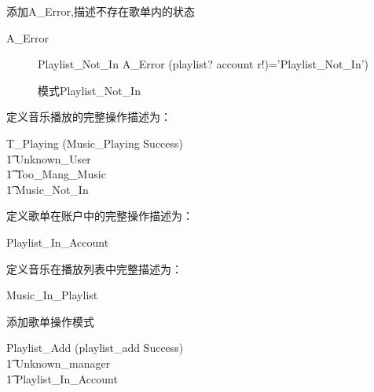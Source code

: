\documentclass[14pt]{article}
\numberwithin{figure}{subsection}
\begin{document}
\begin{minipage}[t]{0.5\linewidth}
    \begin{flushleft}
        添加A\_Error,描述不存在歌单内的状态
        \begin{syntax}
            A\_Error
        \end{syntax}
        \vspace{-1.5cm}
        \begin{figure}[H]
            \setlength{\abovecaptionskip}{0.cm}
            \setlength{\belowcaptionskip}{0.cm}
            \begin{schema}{Playlist\_Not\_In}
                A\_Error
                \where
                (playlist? \not\in account \wedge r!)='Playlist\_Not\_In')
            \end{schema}
            \caption{模式Playlist\_Not\_In}
        \end{figure}

        定义音乐播放的完整操作描述为：
        \begin{syntax}
            \hspace{-0.7cm}
            T\_Playing   (Music\_Playing \wedge Success)\\
            \t1 \vee Unknown\_User\\
            \t1 \vee Too\_Mang\_Music\\
            \t1 \vee Music\_Not\_In\\
        \end{syntax}

        定义歌单在账户中的完整操作描述为：
        \begin{syntax}
            \hspace{-0.7cm}
            Playlist\_In\_Account 
        \end{syntax}

        定义音乐在播放列表中完整描述为：
        \begin{syntax}
            \hspace{-0.7cm}
            Music\_In\_Playlist 
        \end{syntax}

        添加歌单操作模式
        \begin{syntax}
            \hspace{-0.7cm}
            Playlist\_Add   (playlist\_add \wedge Success)\\
            \t1 \vee Unknown\_manager\\
            \t1 \vee Playlist\_In\_Account
        \end{syntax}


\end{flushleft}
\end{minipage}
\end{document}
